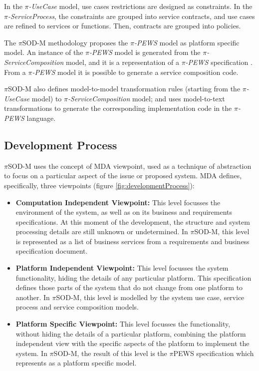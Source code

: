 
In the \textit{$\pi$-UseCase} model, use cases restrictions are designed as
constraints. In the \textit{$\pi$-ServiceProcess}, the constraints are grouped
into service contracts, and use cases are refined to services or functions.
Then, contracts are grouped into policies.


 The $\pi$SOD-M methodology proposes the \textit{$\pi$-PEWS} model as platform
 specific model. An instance of the \textit{$\pi$-PEWS} model is generated from
 the \textit{$\pi$-ServiceComposition} model, and it is a representation of a
 \textit{$\pi$-PEWS} specification \cite{BaCAM05,Placido2010LTPD}. From
 a \textit{$\pi$-PEWS} model it is possible to generate a service composition
 code.


  $\pi$SOD-M also defines model-to-model transformation rules (starting from
  the \textit{$\pi$-UseCase} model) to \textit{$\pi$-ServiceComposition} model;
  and uses model-to-text transformations to generate the corresponding
  implementation code in the \textit{$\pi$-PEWS} language. 
  


\subsection{Development Process}


$\pi$SOD-M uses the concept of MDA viewpoint, used as a technique of
abstraction to focus on a particular aspect of the issue or proposed system.
MDA defines, specifically, three viewpoints (figure
\ref{fig:developmentProcess}):

\begin{itemize}
  \item \textbf{Computation Independent Viewpoint:} This level focusses the
  environment of the system, as well as on its business and requirements
  specifications. At this moment of the development, the structure and system
  processing details are still unknown or undetermined. In $\pi$SOD-M, this
  level is represented as a list of business services from a requirements and
  business specification document. 
  \item \textbf{Platform Independent Viewpoint:} This level focusses the system
  functionality, hiding the details of any particular platform. This
  specification defines those parts of the system that do not
  change from one platform to another. In $\pi$SOD-M, this level is modelled by the system use case, service
  process and service composition models.
  \item \textbf{Platform Specific Viewpoint:} This level focusses the
  functionality, without hiding the details of a particular platform,
  combining the platform independent view with the specific aspects of the platform to
  implement the system.  In $\pi$SOD-M, the result of this level is the
  $\pi$PEWS specification \cite{Placido2010LTPD} which represents as a platform
  specific model.
\end{itemize}


